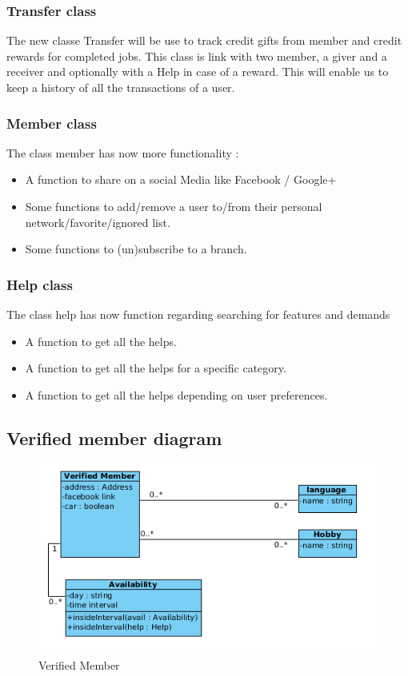 \documentclass[11pt, a4paper]{article}   	%
\begin{document}
\subsubsection{Transfer class}

The new classe Transfer will be use to track credit gifts from member and credit rewards for completed jobs. This class is link with two member, a giver and a receiver and optionally with a Help in case of a reward. This will enable us to keep a history of all the transactions of a user.

\subsubsection{Member class}

The class member has now more functionality :
\begin{itemize}
\item A function to share on a social Media like Facebook / Google+
\item Some functions to add/remove a user to/from their personal network/favorite/ignored list.
\item Some functions to (un)subscribe to a branch.
\end{itemize}

\subsubsection{Help class}

The class help has now function regarding searching for features and demands
\begin{itemize}
\item A function to get all the helps.
\item A function to get all the helps for a specific category.
\item A function to get all the helps depending on user preferences.
\end{itemize}

\subsection{Verified member diagram}

\begin{figure}[!ht]
   \includegraphics[width=\textwidth]{verifiedMember.png}
   \caption{\label{verifiedMember} Verified Member}
\end{figure}
\end{document}
